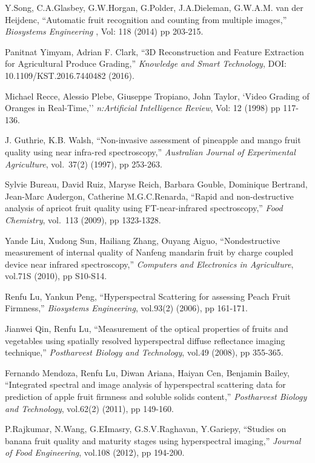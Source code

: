 \documentclass[conference]{IEEEtran}
\begin{document}
\begin{thebibliography}{1}
	Y.Song, C.A.Glasbey, G.W.Horgan, G.Polder, J.A.Dieleman, G.W.A.M. van der Heijdenc, ``Automatic fruit recognition and counting from multiple images,'' {\em Biosystems Engineering }, Vol: 118 (2014) pp 203-215.
	
	Panitnat Yimyam, Adrian F. Clark, ``3D Reconstruction and Feature Extraction for Agricultural Produce Grading,'' {\em Knowledge and Smart Technology}, DOI: 10.1109/KST.2016.7440482 (2016).
	
	Michael Recce, Alessio Plebe, Giuseppe Tropiano, John Taylor, `Video Grading of Oranges in Real-Time,'' {\em n:Artificial Intelligence Review}, Vol: 12 (1998) pp 117-136.
	
	J. Guthrie, K.B. Walsh, ``Non-invasive assessment of pineapple and mango fruit quality using near infra-red spectroscopy,'' {\em Australian Journal of Experimental Agriculture}, vol.~37(2) (1997), pp 253-263.
	
	Sylvie Bureau, David Ruiz, Maryse Reich, Barbara Gouble, Dominique Bertrand, Jean-Marc Audergon, Catherine M.G.C.Renarda, ``Rapid and non-destructive analysis of apricot fruit quality using FT-near-infrared spectroscopy,'' {\em Food Chemistry}, vol.~113 (2009), pp 1323-1328.
	
	Yande Liu, Xudong Sun, Hailiang Zhang, Ouyang Aiguo, ``Nondestructive measurement of internal quality of Nanfeng mandarin fruit by charge coupled device near infrared spectroscopy,'' {\em Computers and Electronics in Agriculture}, vol.71S (2010), pp S10-S14.
	
	Renfu Lu, Yankun Peng, ``Hyperspectral Scattering for assessing Peach Fruit Firmness,'' {\em Biosystems Engineering}, vol.93(2) (2006), pp 161-171.
	
	Jianwei Qin, Renfu Lu, ``Measurement of the optical properties of fruits and vegetables using spatially resolved hyperspectral diffuse reflectance imaging technique,'' {\em Postharvest Biology and Technology}, vol.49 (2008), pp 355-365.
	
	Fernando Mendoza, Renfu Lu, Diwan Ariana, Haiyan Cen, Benjamin Bailey, ``Integrated spectral and image analysis of hyperspectral scattering data for prediction of apple fruit firmness and soluble solids content,'' {\em Postharvest Biology and Technology}, vol.62(2) (2011), pp 149-160.
	
	P.Rajkumar, N.Wang, G.EImasry, G.S.V.Raghavan, Y.Gariepy, ``Studies on banana fruit quality and maturity stages using hyperspectral imaging,'' {\em Journal of Food Engineering}, vol.108 (2012), pp 194-200.
	

\end{thebibliography}
\end{document}
